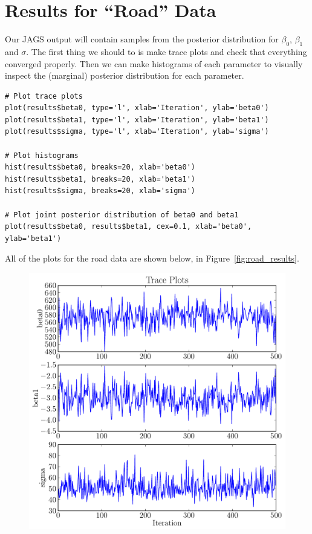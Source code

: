 \section{Results for ``Road'' Data}
Our JAGS output will contain samples from the posterior distribution for
$\beta_0$, $\beta_1$ and $\sigma$. The first thing we should to is make
trace plots and check that everything converged properly. Then we can make
histograms of each parameter to visually inspect the (marginal) posterior
distribution for each parameter.
\begin{framed}
\begin{verbatim}
# Plot trace plots
plot(results$beta0, type='l', xlab='Iteration', ylab='beta0')
plot(results$beta1, type='l', xlab='Iteration', ylab='beta1')
plot(results$sigma, type='l', xlab='Iteration', ylab='sigma')

# Plot histograms
hist(results$beta0, breaks=20, xlab='beta0')
hist(results$beta1, breaks=20, xlab='beta1')
hist(results$sigma, breaks=20, xlab='sigma')

# Plot joint posterior distribution of beta0 and beta1
plot(results$beta0, results$beta1, cex=0.1, xlab='beta0', ylab='beta1')
\end{verbatim}
\end{framed}
All of the plots for the road data are shown below, in Figure~\ref{fig:road_results}.
\begin{figure}[ht!]
\begin{center}
\includegraphics[scale=0.5]{Figures/road_trace.pdf}
\end{center}
\end{figure}

